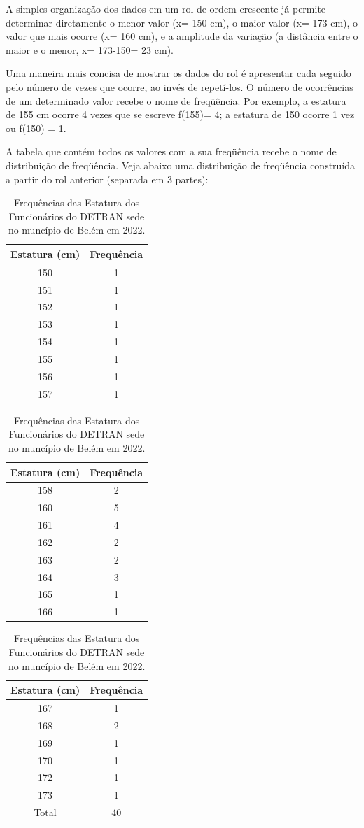 A simples organização dos dados em um rol de ordem crescente já permite determinar diretamente o menor valor (x= 150 cm), o maior valor (x= 173 cm), o valor que mais ocorre (x= 160 cm), e a amplitude da variação (a distância entre o maior e o menor, x= 173-150= 23 cm).\vskip0.3cm


Uma maneira mais concisa de mostrar os dados do rol é apresentar cada seguido pelo número de vezes que ocorre, ao invés de repetí-los. O número de ocorrências de um determinado valor recebe o nome de freqüência. Por exemplo, a estatura de 155 cm ocorre 4 vezes que se escreve f(155)= 4; a estatura de 150 ocorre 1 vez ou f(150) = 1.\vskip0.3cm


A tabela que contém todos os valores com a sua freqüência recebe o nome de distribuição de freqüência. Veja abaixo uma distribuição de freqüência construída a partir do rol anterior (separada em 3 partes):

\begin{center}
\begin{table}[!htb]
    \centering
    {
    \caption{Frequências das Estatura dos Funcionários do DETRAN sede no muncípio de Belém em 2022.}
    \label{estatura2}
    \vspace{0.2cm}
\begin{tabular}{c|c}
\hline\hline
Estatura (cm) & Frequência \\
  \hline\hline
  150 & 1  \\
  151 & 1 \\
  152 & 1  \\
  153 & 1  \\
  154 & 1  \\
  155 & 1  \\
  156 & 1  \\
  157 & 1  \\
  \hline\hline
\end{tabular}}
\begin{tabular}{c|c}
\hline\hline 
Estatura (cm) & Frequência \\
  \hline\hline
  158 & 2  \\
  160 & 5 \\
  161 & 4  \\
  162 & 2  \\
  163 & 2  \\
  164 & 3  \\
  165 & 1  \\
  166 & 1  \\
  \hline\hline
\end{tabular}
\begin{tabular}{c|c}
\hline
Estatura (cm) & Frequência \\
  \hline\hline
  167 & 1  \\
  168 & 2 \\
  169 & 1  \\
  170 & 1 \\
  172 & 1 \\
  173 & 1 \\
  \hline\hline
  Total & 40 \\
  \hline\hline
\end{tabular}
\end{table}
\end{center}


